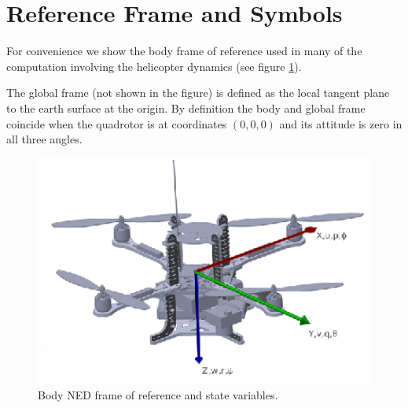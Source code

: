 \documentclass[a4paper,11pt]{report}
\begin{document}
\section{Reference Frame and Symbols}

For convenience we show the body frame of reference used in many of the computation involving the helicopter dynamics (see figure \ref{fig:axes}).
 
The global frame (not shown in the figure) is defined as the local tangent plane to the earth surface at the origin. 
By definition the body and global frame coincide when the quadrotor is at coordinates $(0,0,0)$ and its attitude is zero in all three angles.
\begin{figure}[htbp]
 \begin{center}
 \includegraphics[width=13cm]{./axes.eps}
\caption{Body NED frame of reference and state variables.\label{fig:axes}}
\end{center}
\end{figure} 
\end{document}

